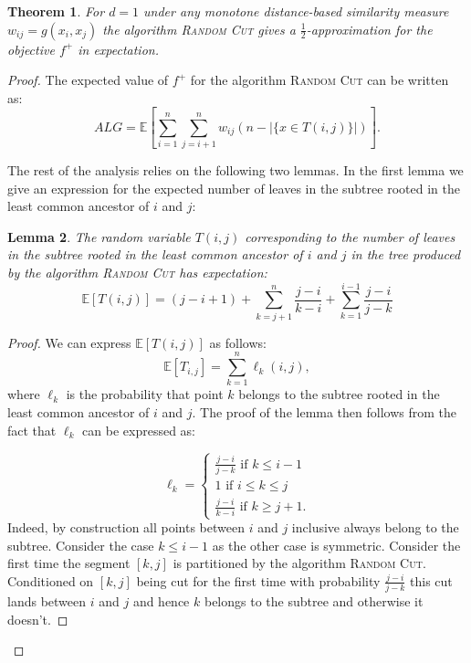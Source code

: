\documentclass{article}
\newtheorem{theorem}{Theorem}[section]
\newtheorem{lemma}[theorem]{Lemma}
\begin{document}
\begin{theorem}\label{thm:random-cut-analysis}
For $d = 1$ under any monotone distance-based similarity measure $w_{ij} = g(x_i, x_j)$ the algorithm \textsc{Random Cut} gives a $\frac12$-approximation for the objective $f^+$ in expectation.
\end{theorem}
\begin{proof}
The expected value of $f^+$ for the algorithm \textsc{Random Cut} can be written as:
$$ALG = \mathbb E\left[\sum_{i = 1}^n \sum_{j = i + 1}^n w_{ij} (n - |\{x \in T(i,j)\}|)\right].$$

The rest of the analysis relies on the following two lemmas. In the first lemma we give an expression for the expected number of leaves in the subtree rooted in the least common ancestor of $i$ and $j$:
\begin{lemma}\label{lem:rand-expectation}
The random variable $T(i,j)$ corresponding to the number of leaves in the subtree rooted in the least common ancestor of $i$ and $j$ in the tree produced by the algorithm \textsc{Random Cut} has expectation:
$$\mathbb E[T(i,j)] = (j - i + 1) + \sum_{k = j + 1}^n \frac{j - i}{k - i} + \sum_{k = 1}^{i - 1} \frac{j - i}{j - k}$$
\end{lemma}
\begin{proof}
We can express $\mathbb E[T(i,j)]$ as follows:
$$\mathbb E[T_{i,j}] = \sum_{k = 1}^n \ell_k(i,j),$$
where $\ell_k$ is the probability that point $k$ belongs to the subtree rooted in the least common ancestor of $i$ and $j$.
The proof of the lemma then follows from the fact that $\ell_k$ can be expressed as:

$$
\ell_k = 
\begin{cases}
\frac{j - i}{j - k} \text{ if } k \le i - 1 \\
1 \text { if } i \le k \le j \\
\frac{j - i}{k - i} \text { if } k \ge j + 1.
\end{cases}
$$
Indeed, by construction all points between $i$ and $j$ inclusive always belong to the subtree.
Consider the case $k \le i - 1$ as the other case is symmetric. Consider the first time the segment $[k,j]$ is partitioned by the algorithm \textsc{Random Cut}.
Conditioned on $[k,j]$ being cut for the first time with probability $\frac{j - i}{j - k}$ this cut lands between $i$ and $j$ and hence $k$ belongs to the subtree and otherwise it doesn't.

\end{proof}


\end{proof}
\end{document}
